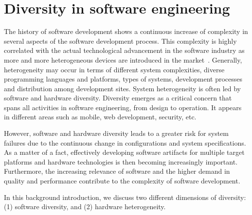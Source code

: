 \section{Diversity in software engineering}
\label{bg:Diversity in software engineering}
The history of software development shows a continuous increase of complexity in several aspects of the software development process. This complexity is highly correlated with the actual technological advancement in the software industry as more and more heterogeneous devices are introduced in the market~\cite{betz2011improving}. 
Generally, heterogeneity may occur in terms of different system complexities, diverse programming languages and platforms, types of systems, development processes and distribution among development sites\cite{ghazi2015heterogeneous}.
System heterogeneity is often led by software and hardware diversity.
Diversity emerges as a critical concern that spans all activities in software engineering, from design to operation\cite{acher2014software}. It appears in different areas such as mobile, web development\cite{doukas2013compose}, security\cite{allier2015multitier}, etc.

However, software and hardware diversity leads to a greater risk for system failures due to the continuous change in configurations and system specifications.
As a matter of a fact, effectively developing software artifacts for multiple target platforms and hardware technologies is then becoming increasingly important.
Furthermore, the increasing relevance of software and the higher demand in quality and performance contribute to the complexity of software development.

In this background introduction, we discuss two different dimensions of diversity: (1) software diversity, and (2) hardware heterogeneity.

 
 
